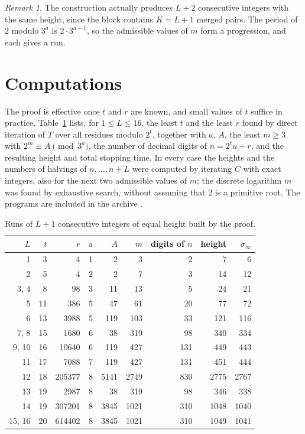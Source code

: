 \documentclass[11pt]{amsart}
\theoremstyle{definition}
\theoremstyle{remark}
\newtheorem{remark}[theorem]{Remark}
\begin{document}
\begin{remark}
The construction actually produces $L+2$ consecutive integers with the same height, since the block contains $K=L+1$ merged pairs. The period of $2$ modulo $3^a$ is $2\cdot3^{a-1}$, so the admissible values of $m$ form a progression, and each gives a run.
\end{remark}

\section{Computations}\label{sec:comp}

The proof is effective once $t$ and $r$ are known, and small values of $t$ suffice in practice. Table~\ref{tab:runs} lists, for $1\le L\le 16$, the least $t$ and the least $r$ found by direct iteration of $T$ over all residues modulo $2^t$, together with $a$, $A$, the least $m\ge3$ with $2^m\equiv A\pmod{3^a}$, the number of decimal digits of $n=2^tu+r$, and the resulting height and total stopping time. In every case the heights and the numbers of halvings of $n,\dots,n+L$ were computed by iterating $C$ with exact integers, also for the next two admissible values of $m$; the discrete logarithm $m$ was found by exhaustive search, without assuming that $2$ is a primitive root. The programs are included in the archive \cite{Artifact}.

\begin{table}[ht]
\caption{Runs of $L+1$ consecutive integers of equal height built by the proof.}\label{tab:runs}
\small
\begin{tabular}{@{}rrrrrrrrr@{}}
\toprule
$L$ & $t$ & $r$ & $a$ & $A$ & $m$ & digits of $n$ & height & $\sigma_\infty$ \\
\midrule
1 & 3 & 4 & 1 & 2 & 3 & 2 & 7 & 6 \\
2 & 5 & 4 & 2 & 2 & 7 & 3 & 14 & 12 \\
3, 4 & 8 & 98 & 3 & 11 & 13 & 5 & 24 & 21 \\
5 & 11 & 386 & 5 & 47 & 61 & 20 & 77 & 72 \\
6 & 13 & 3988 & 5 & 119 & 103 & 33 & 121 & 116 \\
7, 8 & 15 & 1680 & 6 & 38 & 319 & 98 & 340 & 334 \\
9, 10 & 16 & 10640 & 6 & 119 & 427 & 131 & 449 & 443 \\
11 & 17 & 7088 & 7 & 119 & 427 & 131 & 451 & 444 \\
12 & 18 & 205377 & 8 & 5141 & 2749 & 830 & 2775 & 2767 \\
13 & 19 & 2987 & 8 & 38 & 319 & 98 & 346 & 338 \\
14 & 19 & 307201 & 8 & 3845 & 1021 & 310 & 1048 & 1040 \\
15, 16 & 20 & 614402 & 8 & 3845 & 1021 & 310 & 1049 & 1041 \\
\bottomrule
\end{tabular}
\end{table}
\end{document}
